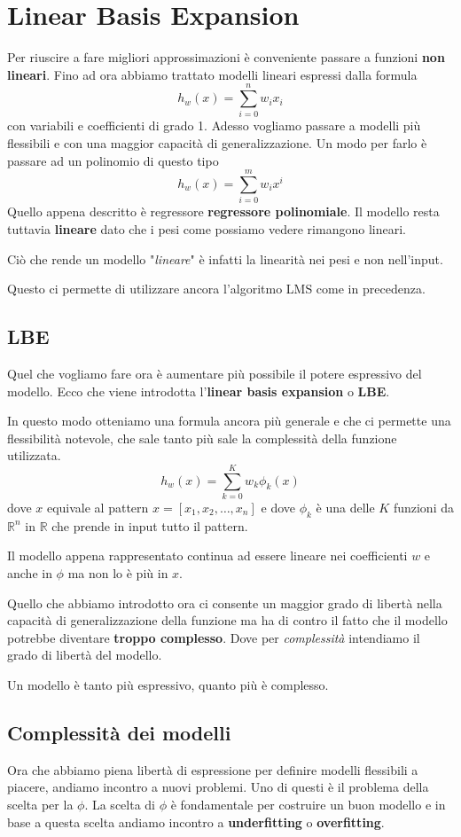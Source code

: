 \chapter{Linear Basis Expansion}
Per riuscire a fare migliori approssimazioni \`e conveniente passare a funzioni \textbf{non lineari}.
Fino ad ora abbiamo trattato modelli lineari espressi dalla formula
\[ h_w(x) = \sum_{i = 0}^n w_i x_i \]
con variabili e coefficienti di grado 1. Adesso vogliamo passare a modelli pi\`u flessibili e con una maggior
capacit\`a di generalizzazione. Un modo per farlo \`e passare ad un polinomio di questo tipo
\[ h_w(x) = \sum_{i = 0}^m w_i x^i \]
Quello appena descritto \`e regressore \textbf{regressore polinomiale}. Il modello resta tuttavia \textbf{lineare}
dato che i pesi come possiamo vedere rimangono lineari.

Ci\`o che rende un modello "\emph{lineare}" \`e infatti la linearit\`a nei pesi e non nell'input.

Questo ci permette di utilizzare ancora l'algoritmo LMS come in precedenza.

\section{LBE}
Quel che vogliamo fare ora \`e aumentare pi\`u possibile il potere espressivo del modello. Ecco che viene introdotta
l'\textbf{linear basis expansion} o \textbf{LBE}.

In questo modo otteniamo una formula ancora pi\`u generale e che ci permette una flessibilit\`a notevole, che sale tanto
pi\`u sale la complessit\`a della funzione utilizzata.
\[ h_w(x) = \sum_{k = 0}^K w_k \phi_k(x) \]
dove $x$ equivale al pattern $x = [x_1, x_2, \dots, x_n]$ e dove $\phi_k$ \`e una delle $K$ funzioni da $\mathbb{R}^n$
in $\mathbb{R}$ che prende in input tutto il pattern.

Il modello appena rappresentato continua ad essere lineare nei coefficienti $w$ e anche in $\phi$ ma non lo \`e pi\`u
in $x$.

Quello che abbiamo introdotto ora ci consente un maggior grado di libert\`a nella capacit\`a di generalizzazione della
funzione ma ha di contro il fatto che il modello potrebbe diventare \textbf{troppo complesso}. Dove per
\emph{complessit\`a} intendiamo il grado di libert\`a del modello.

Un modello \`e tanto pi\`u espressivo, quanto pi\`u \`e complesso.

\section{Complessit\`a dei modelli}
Ora che abbiamo piena libert\`a di espressione per definire modelli flessibili a piacere, andiamo incontro a nuovi
problemi. Uno di questi \`e il problema della scelta per la $\phi$. La scelta di $\phi$ \`e fondamentale per costruire
un buon modello e in base a questa scelta andiamo incontro a \textbf{underfitting} o \textbf{overfitting}.

